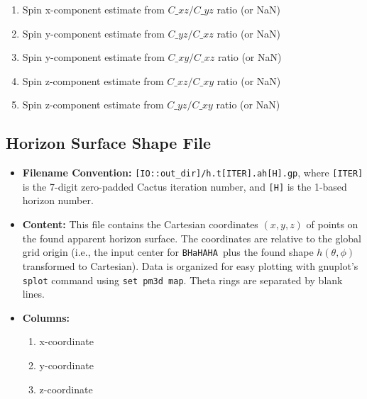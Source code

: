 \documentclass[a4paper,11pt]{article}
\newcommand{\file}[1]{{\tt #1}}
\newcommand{\bhahlib}{\texttt{BHaHAHA}} %
\begin{document}
\begin{itemize}
\begin{enumerate}
        \item Spin x-component estimate from $C\_{xz}/C\_{yz}$ ratio (or NaN)
        \item Spin y-component estimate from $C\_{yz}/C\_{xz}$ ratio (or NaN)
        \item Spin y-component estimate from $C\_{xy}/C\_{xz}$ ratio (or NaN)
        \item Spin z-component estimate from $C\_{xz}/C\_{xy}$ ratio (or NaN)
        \item Spin z-component estimate from $C\_{yz}/C\_{xy}$ ratio (or NaN)
    \end{enumerate}
\end{itemize}

\subsection{Horizon Surface Shape File}
\label{ssec:output_shape}
\begin{itemize}
    \item \textbf{Filename Convention:} \file{[IO::out\_dir]/h.t[ITER].ah[H].gp}, where \texttt{[ITER]} is the 7-digit zero-padded Cactus iteration number, and \texttt{[H]} is the 1-based horizon number.
    \item \textbf{Content:} This file contains the Cartesian coordinates $(x,y,z)$ of points on the found apparent horizon surface. The coordinates are relative to the global grid origin (i.e., the input center for \bhahlib\ plus the found shape $h(\theta,\phi)$ transformed to Cartesian). Data is organized for easy plotting with gnuplot's \texttt{splot} command using \texttt{set pm3d map}. Theta rings are separated by blank lines.
    \item \textbf{Columns:}
    \begin{enumerate}
        \item x-coordinate
        \item y-coordinate
        \item z-coordinate
    \end{enumerate}
\end{itemize}
\end{document}
